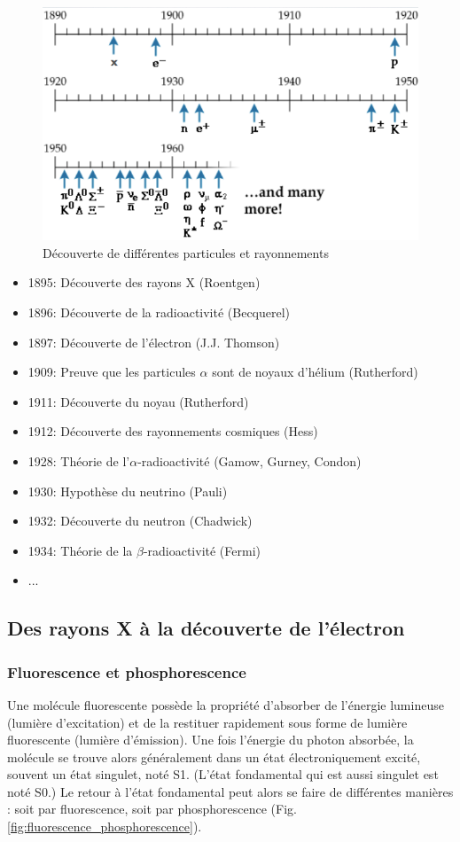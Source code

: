 \begin{figure}[ht]
    \centering
    \includegraphics[scale=0.50]{Images1/ldt.png}
    \caption{Découverte de différentes particules et rayonnements}
    \label{fig:decouvertes}
\end{figure}

\begin{itemize}
    \item 1895: Découverte des rayons X (Roentgen)
    \item 1896: Découverte de la radioactivité (Becquerel)
    \item 1897: Découverte de l'électron (J.J. Thomson)
    \item 1909: Preuve que les particules $\alpha$ sont de noyaux d'hélium (Rutherford)
    \item 1911: Découverte du noyau (Rutherford)
    \item 1912: Découverte des rayonnements cosmiques (Hess)
    \item 1928: Théorie de l'$\alpha$-radioactivité (Gamow, Gurney, Condon)
    \item 1930: Hypothèse du neutrino (Pauli)
    \item 1932: Découverte du neutron (Chadwick)
    \item 1934: Théorie de la $\beta$-radioactivité (Fermi)
    \item ...
\end{itemize}


\subsection{Des rayons X à la découverte de l'électron}
\subsubsection{Fluorescence et phosphorescence}
Une molécule fluorescente possède la propriété d'absorber de l'énergie lumineuse (lumière d'excitation) et de la restituer rapidement sous forme de lumière fluorescente (lumière d'émission). Une fois l'énergie du photon absorbée, la molécule se trouve alors généralement dans un état électroniquement excité, souvent un état singulet, noté S1. (L'état fondamental qui est aussi singulet est noté S0.) Le retour à l'état fondamental peut alors se faire de différentes manières : soit par fluorescence, soit par phosphorescence (Fig. \ref{fig:fluorescence_phosphorescence}).

